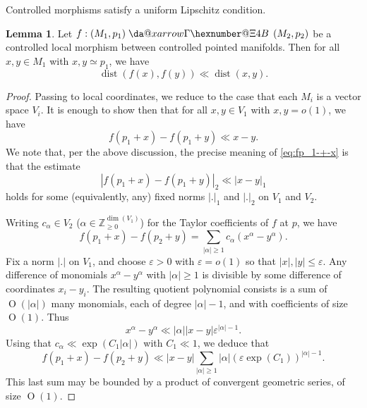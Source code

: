 \documentclass[reqno]{amsart}
\makeatletter
\newcommand*{\da@rightarrow}{\mathchar"0\hexnumber@\symAMSa 4B }
\newcommand*{\xdashrightarrow}[2][]{%
  \mathrel{%
    \mathpalette{\da@xarrow{#1}{#2}{}\da@rightarrow{\,}{}}{}%
  }%
}
\newcommand*{\da@xarrow}[7]{%
  \sbox0{$\ifx#7\scriptstyle\scriptscriptstyle\else\scriptstyle\fi#5#1#6\m@th$}%
  \sbox2{$\ifx#7\scriptstyle\scriptscriptstyle\else\scriptstyle\fi#5#2#6\m@th$}%
  \sbox4{$#7\dabar@\m@th$}%
  \dimen@=\wd0 %
  \ifdim\wd2 >\dimen@
    \dimen@=\wd2 %
  \fi
  \count@=2 %
  \def\da@bars{\dabar@\dabar@}%
  \@whiledim\count@\wd4<\dimen@\do{%
    \advance\count@\@ne
    \expandafter\def\expandafter\da@bars\expandafter{%
      \da@bars
      \dabar@ 
    }%
  }%
  \mathrel{#3}%
  \mathrel{%
    \mathop{\da@bars}\limits
    \ifx\\#1\\%
    \else
      _{\copy0}%
    \fi
    \ifx\\#2\\%
    \else
      ^{\copy2}%
    \fi
  }%
  \mathrel{#4}%
}
\def\eps{\varepsilon}
\DeclareMathOperator{\dist}{dist}
\def\O{\operatorname{O}}
\theoremstyle{plain} \newtheorem{theorem} {Theorem}
\theoremstyle{definition} \newtheorem{definition} [theorem] {Definition}
\theoremstyle{itplain} %
\newtheorem{lemma}[theorem]{Lemma}
\numberwithin{equation}{section}
\numberwithin{theorem}{section}
\renewcommand{\geq}{\geqslant}
\renewcommand{\leq}{\leqslant}
\makeatother
\begin{document}
Controlled morphisms satisfy a uniform Lipschitz condition.
\begin{lemma}\label{lem:controlled-uniform-continuity-origin}
  Let $f : (M_1, p_1) \xdashrightarrow{} (M_2, p_2)$ be a controlled local morphism between controlled pointed manifolds.  Then for all $x,y \in M_1$ with $x,y \simeq p_1$, we have
  \begin{equation*}
    \dist(f(x), f(y)) \ll \dist(x,y).
  \end{equation*}
\end{lemma}
\begin{proof}
  Passing to local coordinates, we reduce to the case that each $M_i$ is a vector space $V_i$.  It is enough to show then that for all $x, y \in V_1$ with $x, y = o(1)$, we have
  \begin{equation}\label{eq:fp_1-+-x}
    f(p_1 + x) - f(p_1 + y) \ll x - y.
  \end{equation}
  We note that, per the above discussion, the precise meaning of \eqref{eq:fp_1-+-x} is that the estimate
  \begin{equation*}
    |f(p_1 + x) - f(p_1 + y)|_2 \ll |x - y|_1
  \end{equation*}
  holds for some (equivalently, any) fixed norms $|.|_1$ and $|.|_2$ on $V_1$ and $V_2$.  

  Writing $c_\alpha \in V_2$ ($\alpha \in \mathbb{Z}_{\geq 0}^{\dim(V_1)}$) for the Taylor coefficients of $f$ at $p$, we have
    \begin{equation*}
      f(p_1 + x) - f(p_2 + y) = \sum_{|\alpha| \geq 1} c_\alpha (x^\alpha - y^\alpha).
    \end{equation*}
  Fix a norm $|.|$ on $V_1$, and choose $\eps > 0$ with $\eps = o(1)$ so that $|x|, |y| \leq \eps$.  Any difference of monomials $x^\alpha - y^\alpha$ with $|\alpha| \geq 1$ is divisible by some difference of coordinates $x_i - y_i$.  The resulting quotient polynomial consists is a sum of $\O(|\alpha|)$ many monomials, each of degree $|\alpha| -1$, and with coefficients of size $\O(1)$.  Thus
  \begin{equation*}
    x^\alpha - y^\alpha \ll |\alpha| |x-y| \eps^{|\alpha| - 1}.
  \end{equation*}
  Using that $c_\alpha \ll \exp(C_1 |\alpha|)$ with $C_1 \ll 1$, we deduce that
  \begin{equation*}
    f (p_1 + x) - f (p_2 + y) \ll |x-y| \sum _{|\alpha| \geq 1} |\alpha| (\eps \exp(C_1))^{|\alpha|-1}.
  \end{equation*}
  This last sum may be bounded by a product of convergent geometric series, of size $\O(1)$.
\end{proof}
\end{document}
